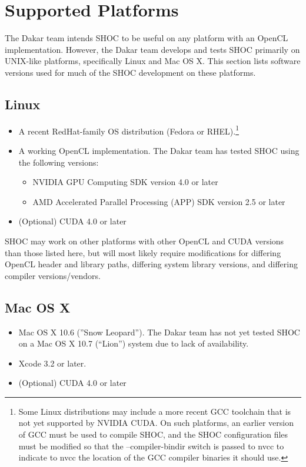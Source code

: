 \documentclass[11pt]{article}
\begin{document}
\section{Supported Platforms}\label{sec:supported}

The Dakar team intends SHOC to be useful on any platform with an
OpenCL implementation. However, the Dakar team develops and tests
SHOC primarily on UNIX-like platforms, specifically Linux and
Mac OS X.
This section lists software versions used for much of the SHOC development
on these platforms.

\subsection{Linux}

\begin{itemize}
\item A recent RedHat-family OS distribution (Fedora or RHEL).\footnote{
Some Linux distributions may include a more recent GCC toolchain that is
not yet supported by NVIDIA CUDA.  On such platforms, an earlier version of GCC
must be used to compile SHOC, and the SHOC configuration files must be
modified so that the --compiler-bindir switch is passed to nvcc to 
indicate to nvcc the location of the GCC compiler binaries it should use.}
\item A working OpenCL implementation. The Dakar team has tested SHOC
using the following versions:
    \begin{itemize}
        \item NVIDIA GPU Computing SDK version 4.0 or later
        \item AMD Accelerated Parallel Processing (APP) SDK version 2.5 or later
    \end{itemize}
\item (Optional) CUDA 4.0 or later
\end{itemize}

SHOC may work on other platforms with other OpenCL and CUDA versions
than those listed here, but will most likely require modifications for
differing OpenCL header and library paths, differing system library versions,
and differing compiler versions/vendors.

\subsection{Mac OS X}

\begin{itemize}
\item Mac OS X 10.6 (''Snow Leopard'').  The Dakar team has not yet tested SHOC on a Mac OS X 10.7 (``Lion'') system due to lack of availability.
\item Xcode 3.2 or later.
\item (Optional) CUDA 4.0 or later
\end{itemize}
\end{document}
